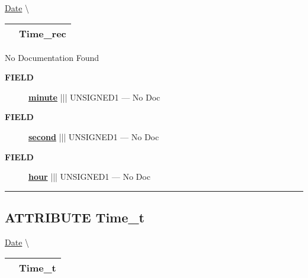 \hypertarget{ecldoc:date.time_rec}{}
\hspace{0pt} \hyperlink{ecldoc:Date}{Date} \textbackslash 

{\renewcommand{\arraystretch}{1.5}
\begin{tabularx}{\textwidth}{|>{\raggedright\arraybackslash}l|X|}
\hline
\hspace{0pt}\mytexttt{\color{red} } & \textbf{Time\_rec} \\
\hline
\end{tabularx}
}

\par





No Documentation Found







\par
\begin{description}
\item [\colorbox{tagtype}{\color{white} \textbf{\textsf{FIELD}}}] \textbf{\underline{minute}} ||| UNSIGNED1 --- No Doc
\item [\colorbox{tagtype}{\color{white} \textbf{\textsf{FIELD}}}] \textbf{\underline{second}} ||| UNSIGNED1 --- No Doc
\item [\colorbox{tagtype}{\color{white} \textbf{\textsf{FIELD}}}] \textbf{\underline{hour}} ||| UNSIGNED1 --- No Doc
\end{description}





\rule{\linewidth}{0.5pt}
\subsection*{\textsf{\colorbox{headtoc}{\color{white} ATTRIBUTE}
Time\_t}}

\hypertarget{ecldoc:date.time_t}{}
\hspace{0pt} \hyperlink{ecldoc:Date}{Date} \textbackslash 

{\renewcommand{\arraystretch}{1.5}
\begin{tabularx}{\textwidth}{|>{\raggedright\arraybackslash}l|X|}
\hline
\hspace{0pt}\mytexttt{\color{red} } & \textbf{Time\_t} \\
\hline
\end{tabularx}
}

\par





